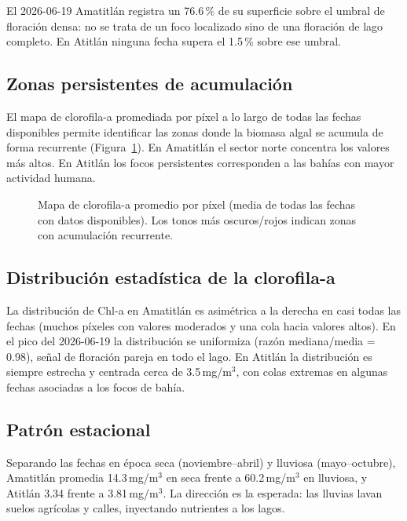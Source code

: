 \documentclass[12pt, a4paper]{article}
\newcommand{\mgm}{\,mg/m$^3$}
\begin{document}
El 2026-06-19 Amatitlán registra un 76.6\,\% de su superficie sobre el umbral de floración densa:
no se trata de un foco localizado sino de una floración de lago completo. En Atitlán ninguna fecha
supera el 1.5\,\% sobre ese umbral.

\subsection{Zonas persistentes de acumulación}

El mapa de clorofila-a promediada por píxel a lo largo de todas las fechas disponibles permite
identificar las zonas donde la biomasa algal se acumula de forma recurrente (Figura~\ref{fig:zonas}).
En Amatitlán el sector norte concentra los valores más altos. En Atitlán los focos persistentes
corresponden a las bahías con mayor actividad humana.

\begin{figure}[H]
  \centering
  \caption{Mapa de clorofila-a promedio por píxel (media de todas las fechas con datos disponibles). Los tonos más oscuros/rojos indican zonas con acumulación recurrente.}
  \label{fig:zonas}
\end{figure}

\subsection{Distribución estadística de la clorofila-a}

La distribución de Chl-a en Amatitlán es asimétrica a la derecha en casi todas las fechas
(muchos píxeles con valores moderados y una cola hacia valores altos). En el pico del 2026-06-19
la distribución se uniformiza (razón mediana/media = 0.98), señal de floración pareja en todo
el lago. En Atitlán la distribución es siempre estrecha y centrada cerca de 3.5\mgm{}, con colas
extremas en algunas fechas asociadas a los focos de bahía.

\subsection{Patrón estacional}

Separando las fechas en época seca (noviembre–abril) y lluviosa (mayo–octubre), Amatitlán
promedia 14.3\mgm{} en seca frente a 60.2\mgm{} en lluviosa, y Atitlán 3.34 frente a 3.81\mgm{}.
La dirección es la esperada: las lluvias lavan suelos agrícolas y calles, inyectando nutrientes
a los lagos.
\end{document}
